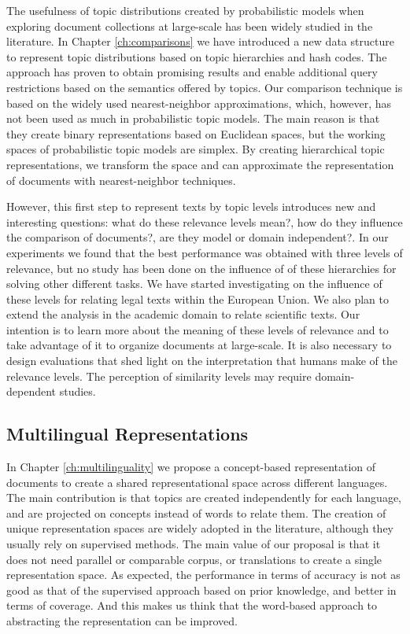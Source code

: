 The usefulness of topic distributions created by probabilistic models when exploring document collections at large-scale has been widely studied in the literature. In Chapter \ref{ch:comparisons} we have introduced a new data structure to represent topic distributions based on topic hierarchies and hash codes. The approach has proven to obtain promising results and enable additional query restrictions based on the semantics offered by topics. Our comparison technique is based on the widely used nearest-neighbor approximations, which, however, has not been used as much in probabilistic topic models. The main reason is that they 
create binary representations based on Euclidean spaces, but the working spaces of probabilistic topic models are simplex. By creating hierarchical topic representations, we transform the space and can approximate the representation of documents with nearest-neighbor techniques.

However, this first step to represent texts by topic levels introduces new and interesting questions: what do these relevance levels mean?, how do they influence the comparison of documents?, are they model or domain independent?. In our experiments we found that the best performance was obtained with three levels of relevance, but no study has been done on the influence of of these hierarchies for solving other different tasks. We have started investigating on the influence of these levels for relating legal texts within the European Union. We also plan to extend the analysis in the academic domain to relate scientific texts. Our intention is to learn more about the meaning of these levels of relevance and to take advantage of it to organize documents at large-scale. It is also necessary to design evaluations that shed light on the interpretation that humans make of the relevance levels. The perception of similarity levels may require domain-dependent studies.



\subsection{Multilingual Representations}

In Chapter \ref{ch:multilinguality} we propose a concept-based representation of documents to create a shared representational space across different languages. The main contribution is that topics are created independently for each language, and are projected on concepts instead of words to relate them. The creation of unique representation spaces are widely adopted in the literature, although they usually rely on supervised methods. The main value of our proposal is that it does not need parallel or comparable corpus, or translations to create a single representation space. As expected, the performance in terms of accuracy is not as good as that of the supervised approach based on prior knowledge, and better in terms of coverage. And this makes us think that the word-based approach to abstracting the representation can be improved.


